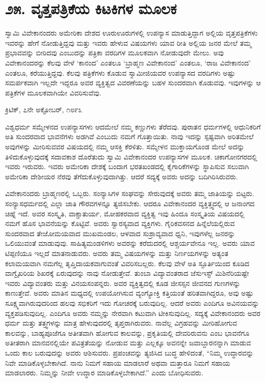 
\chapter*{೨೫. ವೃತ್ತಪತ್ರಿಕೆಯ ಕಿಟಕಿಗಳ ಮೂಲಕ}

ಸ್ವಾಮಿ ವಿವೇಕಾನಂದರು ಅಮೇರಿಕಾ ದೇಶದ ಊರುಊರುಗಳಲ್ಲಿ ಉಪನ್ಯಾಸ ಮಾಡುತ್ತಿದ್ದಾಗ ಅಲ್ಲಿಯ ವೃತ್ತಪತ್ರಿಕೆಗಳು ಇವರನ್ನು ಹೇಗೆ ನೋಡುತ್ತಿದ್ದವು ಮತ್ತು ಇವರು ಹೇಳುವ ವಿಷಯಗಳು ಯಾವ ರೀತಿ ಅಲ್ಲಿಯ ಜನರ ಮೇಲೆ ತಮ್ಮ ಪ್ರಭಾವವನ್ನು ಬೀರಿದವು ಎಂಬುದನ್ನು ಪತ್ರಿಕಾ ವರದಿಗಳ ಮೂಲಕವಾಗಿ ನೋಡುವುದೇ ಮೇಲು. ಅವು ವಿವೇಕಾನಂದರನ್ನು ಕೆಲವು ವೇಳೆ ‘ಕಾನಂದ’ ಎಂತಲೂ ‘ಬ್ರಾಹ್ಮಣ ವಿವೇಕಾನಂದ’ ಎಂತಲೂ, ‘ರಾಜ ವಿವೇಕಾನಂದ’ ಎಂತಲೂ, ಕರೆಯುತ್ತಿದ್ದವು. ಕೆಲವು ಪತ್ರಿಕೆಗಳು ಕೊಡುವ ಸ್ವಾಮೀಜಿಯವರ ಉಪನ್ಯಾಸದ ವರದಿಗಳು ಅಷ್ಟು ಸಮರ್ಪಕವಾಗಿ ಇಲ್ಲದೇ ಇದ್ದರೂ ಅವರ ವ್ಯಕ್ತಿತ್ವದ ವಿವರಣೆಯನ್ನು ಬಹಳ ಸುಂದರವಾಗಿ ಕೊಡುವವು. ಇವುಗಳನ್ನು ಆ ಪತ್ರಿಕೆಗಳ ಮೂಲಕವಾಗಿಯೇ ವಿವರಿಸುವೆವು.

\begin{flushright}
ಕ್ರಿಟಿಕ್, ೭ನೇ ಅಕ್ಟೋಬರ್, ೧೮೯೩
\end{flushright}

 ವಿಶ್ವಧರ್ಮ ಸಮ್ಮೇಳನದ ಉಪನ್ಯಾಸಗಳು ಆದಮೇಲೆ ನಮ್ಮ ಕಣ್ಣುಗಳು ತೆರೆದವು. ಪುರಾತನ ಧರ್ಮಗಳಲ್ಲಿ ಆಧುನಿಕರಿಗೆ ಅತಿ ಸುಂದರವಾದ ಭಾವನೆಗಳು ಅಡಗಿವೆ ಎಂಬುದು ನಮಗೆ ಗೊತ್ತಾಯಿತು. ನಾವು ಇದನ್ನು ಸ್ಪಷ್ಟವಾಗಿ ಅರಿತಮೇಲೆ ಅವುಗಳನ್ನು ಮೀರಿಸುವವರ ವಿಷಯದಲ್ಲಿ ನಮ್ಮ ಆಸಕ್ತಿ ಕೆರಳಿತು. ಸಮ್ಮೇಳನ ಮುಕ್ತಾಯಗೊಂಡ ಮೇಲೆ ಅದನ್ನು ತಿಳಿದುಕೊಳ್ಳುವುದಕ್ಕೆ ಸದಾವಕಾಶ ದೊರೆತುದು ಸ್ವಾಮಿ ವಿವೇಕಾನಂದರ ಉಪನ್ಯಾಸಗಳ ಮೂಲಕ. ಚಿಕಾಗೋನಗರದಲ್ಲಿ ಇವರು ಇರುವರು. ಇವರು ಅಮೇರಿಕಾ ದೇಶಕ್ಕೆ ಬಂದಾಗ ಭರತಖಂಡದಲ್ಲಿ ಕೈಗಾರಿಕೆಗಳನ್ನು ಸ್ಥಾಪಿಸುವ ಸಲುವಾಗಿ ಅಮೇರಿಕಾ ದೇಶೀಯರ ನೆರವು ತೆಗೆದುಕೊಳ್ಳುವುದಾಗಿತ್ತು. ಆದರೆ ಸದ್ಯಕ್ಕೆ ಅವರು ಅದನ್ನು ಬದಿಗಿರಿಸಿರುವರು. 

 ವಿವೇಕಾನಂದರು ಬ್ರಾಹ್ಮಣರಲ್ಲಿ ಒಬ್ಬರು. ಸಂನ್ಯಾಸಿಗಳ ಸಂಘವನ್ನು ಸೇರುವುದಕ್ಕೆ ಅವರು ತಮ್ಮ ಜಾತಿಯನ್ನು ಬಿಟ್ಟರು. ಸಂನ್ಯಾಸಧರ್ಮದಲ್ಲಿ ಎಲ್ಲಾ ಜಾತಿ ಗೌರವಗಳನ್ನೂ ತ್ಯಜಿಸಬೇಕು. ಆದರೂ ವಿವೇಕಾನಂದರ ವ್ಯಕ್ತಿತ್ತ್ವದಲ್ಲಿ ಆ ಜನಾಂಗದ ಚಿಹ್ನೆ ಇದೆ. ಅವರ ಸಂಸ್ಕೃತಿ, ವಾಕ್ಚಾತುರ್ಯ, ಮೋಹಕರವಾದ ವ್ಯಕ್ತಿತ್ವ ಇವು ಹಿಂದೂ ಸಂಸ್ಕೃತಿಯ ವಿಷಯದಲ್ಲಿ ನಮಗೆ ಹೊಸ ಭಾವನೆಯನ್ನು ಕೊಟ್ಟಿವೆ. ಅವರು ಸ್ವಾರಸ್ಯವಾದ ವ್ಯಕ್ತಿಗಳು. ಗೈರಿಕವಸನದ ಹಿನ್ನೆಲೆಯಲ್ಲಿರುವ ಸುಂದರವಾದ ತೇಜೋಮಯವಾದ ಮುಖಮಂಡಲ, ಆಳವಾದ ಸುಶ್ರಾವ್ಯವಾದ ಧ್ವನಿ, ಇವುಗಳೆಲ್ಲ ಜನರನ್ನು ಒಲಿಯುವಂತೆ ಮಾಡುವುವು. ಸಾಹಿತ್ಯಮಂಡಳಿಗಳು ಅವರನ್ನು ಕರೆದುದರಲ್ಲಿ ಆಶ್ಚರ್ಯವೇನೂ ಇಲ್ಲ. ಅವರು ಯಾವ ಟಿಪ್ಪಣಿಯೂ ಇಲ್ಲದೆ ಮಾತನಾಡುವರು. ಅವರು ತಮ್ಮ ವಿಷಯಗಳನ್ನು ಮತ್ತು ನಿರ್ಣಯಗಳನ್ನು ಅತ್ಯಂತ ಕಲಾಮಯವಾಗಿ ನಮಗೆಲ್ಲ ತೃಪ್ತಿದಾಯಕವಾಗುವಂತೆ ವಿವರಿಸಬಲ್ಲರು. ಕೆಲವು ವೇಳೆ ಅತಿ ಸ್ಫೂರ್ತಿಯಿಂದ ಕೂಡಿದ ವಾಗ್ವೈಖರಿಯ ಶಿಖರಕ್ಕೆ ಏರುವುದನ್ನು ನಾವು ನೋಡುತ್ತೇವೆ. ತುಂಬಾ ವಿದ್ಯಾವಂತರಾದ ಜೆಸುಇಸ್ಟ್ ಮಿಶಿನೆರಿಯಷ್ಟೇ ಇವರು ವಿದ್ಯಾವಂತರು ಮತ್ತು ವಿನಯಸಂಪನ್ನರು. ಅವರ ವ್ಯಕ್ತಿತ್ವದಲ್ಲಿ ಕೂಡ ಜೀಸಸ್ಸನ ಜೀವನದ ಗುಣಗಳನ್ನು ಕಾಣುತ್ತೇವೆ. ಅವರು ಮಾತಿನ ಮಧ್ಯದಲ್ಲಿ ಉಪಯೋಗಿಸುವ ವ್ಯಂಗ್ಯೋಕ್ತಿ ಕತ್ತಿಯಂತೆ ಹರಿತವಾಗಿದ್ದರೂ, ಅವು ಅಷ್ಟು ಸೂಕ್ಷ್ಮವಾಗಿರುವುದರಿಂದ ಹಲವು ಸಭಿಕರಿಗೆ ಇದು ಗೋಚರಕ್ಕೆ ಬರುವುದಿಲ್ಲ. ಆದರೆ ಅವರು ಎಂದಿಗೂ ಅವಿನಯವನ್ನು ವ್ಯಕ್ತಪಡಿಸುವುದಿಲ್ಲ. ಎಂದಿಗೂ ಅವರು ನಮ್ಮನ್ನು ನೇರವಾಗಿ ಕಟುವಾಗಿ ಟೀಕಿಸುವುದಿಲ್ಲ. ಸದ್ಯಕ್ಕೆ ವಿವೇಕಾನಂದರು ಅವರ ಧರ್ಮ ಮತ್ತು ತತ್ತ್ವಗಳನ್ನು ಮಾತ್ರ ಹೇಳುವುದರಲ್ಲಿ ತೃಪ್ತರಾಗಿರುವರು. ನಾವೆಲ್ಲ ವಿಗ್ರಹವನ್ನು ಮೀರಿಹೋಗುವ ಕಾಲವನ್ನು, ಬಾಹ್ಯಪೂಜೆಗೂ ಅತೀತವಾಗಿ ಹೋಗುವ ಕಾಲವನ್ನು, ಪ್ರಕೃತಿಯಲ್ಲಿ ದೇವರಿರುವನು ಎಂಬ ಭಾವನೆಗೂ ಅತೀತರಾಗಿ ಮಾನವನಲ್ಲಿಯೇ ಪವಿತ್ರತೆಯನ್ನು ನೋಡುವ ಮತ್ತು ಎಲ್ಲಕ್ಕೂ ಅವನನ್ನೇ ಜವಾಬ್ದಾರನನ್ನಾಗಿ ಮಾಡುವ ಒಂದು ಕಾಲ ಬರುವುದನ್ನು ಅವರು ಆಶಿಸುವರು. ಪ್ರಪಂಚವನ್ನು ತ್ಯಜಿಸಿದ ಬುದ್ಧ ಹೇಳಿದಂತೆ, “ನಿಮ್ಮ ಉದ್ಧಾರವನ್ನು ನಿವೇ ಮಾಡಿಕೊಳ್ಳಬೇಕಾಗಿದೆ. ನಾನು ನಿಮಗೆ ಸಹಾಯ ಮಾಡಲಾರೆ ಅಥವಾ ಮತ್ತಾರೂ ನಿಮಗೆ ಸಹಾಯ ಮಾಡಲಾರರು. ನಿಮ್ಮನ್ನು ನೀವೇ ಉದ್ಧಾರ ಮಾಡಿಕೊಳ್ಳಬೇಕಾಗಿದೆ.” ಎಂದು ಬೋಧಿಸುವರು.

